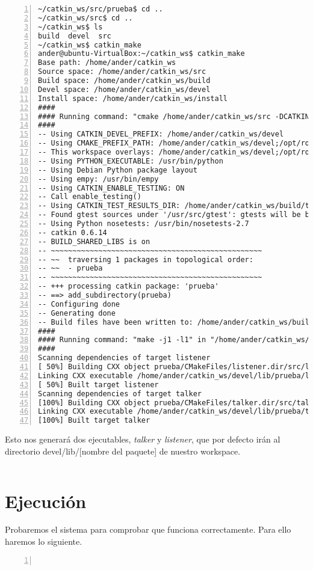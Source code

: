 	\begin{lstlisting}[style=consola,numbers=left]
~/catkin_ws/src/prueba$ cd ..
~/catkin_ws/src$ cd ..
~/catkin_ws$ ls
build  devel  src
~/catkin_ws$ catkin_make
ander@ubuntu-VirtualBox:~/catkin_ws$ catkin_make
Base path: /home/ander/catkin_ws
Source space: /home/ander/catkin_ws/src
Build space: /home/ander/catkin_ws/build
Devel space: /home/ander/catkin_ws/devel
Install space: /home/ander/catkin_ws/install
####
#### Running command: "cmake /home/ander/catkin_ws/src -DCATKIN_DEVEL_PREFIX=/home/ander/catkin_ws/devel -DCMAKE_INSTALL_PREFIX=/home/ander/catkin_ws/install -G Unix Makefiles" in "/home/ander/catkin_ws/build"
####
-- Using CATKIN_DEVEL_PREFIX: /home/ander/catkin_ws/devel
-- Using CMAKE_PREFIX_PATH: /home/ander/catkin_ws/devel;/opt/ros/indigo
-- This workspace overlays: /home/ander/catkin_ws/devel;/opt/ros/indigo
-- Using PYTHON_EXECUTABLE: /usr/bin/python
-- Using Debian Python package layout
-- Using empy: /usr/bin/empy
-- Using CATKIN_ENABLE_TESTING: ON
-- Call enable_testing()
-- Using CATKIN_TEST_RESULTS_DIR: /home/ander/catkin_ws/build/test_results
-- Found gtest sources under '/usr/src/gtest': gtests will be built
-- Using Python nosetests: /usr/bin/nosetests-2.7
-- catkin 0.6.14
-- BUILD_SHARED_LIBS is on
-- ~~~~~~~~~~~~~~~~~~~~~~~~~~~~~~~~~~~~~~~~~~~~~~~~~
-- ~~  traversing 1 packages in topological order:
-- ~~  - prueba
-- ~~~~~~~~~~~~~~~~~~~~~~~~~~~~~~~~~~~~~~~~~~~~~~~~~
-- +++ processing catkin package: 'prueba'
-- ==> add_subdirectory(prueba)
-- Configuring done
-- Generating done
-- Build files have been written to: /home/ander/catkin_ws/build
####
#### Running command: "make -j1 -l1" in "/home/ander/catkin_ws/build"
####
Scanning dependencies of target listener
[ 50%] Building CXX object prueba/CMakeFiles/listener.dir/src/listener.cpp.o
Linking CXX executable /home/ander/catkin_ws/devel/lib/prueba/listener
[ 50%] Built target listener
Scanning dependencies of target talker
[100%] Building CXX object prueba/CMakeFiles/talker.dir/src/talker.cpp.o
Linking CXX executable /home/ander/catkin_ws/devel/lib/prueba/talker
[100%] Built target talker
	\end{lstlisting}
	
	Esto nos generará dos ejecutables, \emph{talker} y \emph{listener}, que por defecto irán al directorio devel/lib/[nombre del paquete] de nuestro workspace.
	
	\begin{lstlisting}[style=consola,numbers=left]

	\end{lstlisting}
	
	\section{Ejecución}
	Probaremos el sistema para comprobar que funciona correctamente. Para ello haremos lo siguiente.
	
	\begin{lstlisting}[style=consola,numbers=left]
	
	\end{lstlisting}